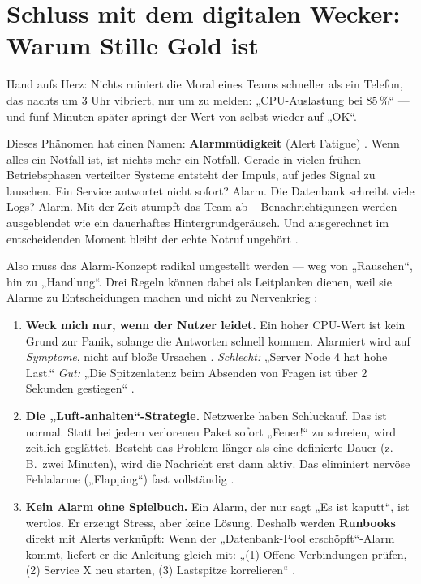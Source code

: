 \section{Schluss mit dem digitalen Wecker: Warum Stille Gold ist}

Hand aufs Herz: Nichts ruiniert die Moral eines Teams schneller als ein Telefon, das nachts um 3 Uhr vibriert, nur um zu melden: „CPU-Auslastung bei 85\,\%“ --- und fünf Minuten später springt der Wert von selbst wieder auf „OK“.

Dieses Phänomen hat einen Namen: \textbf{Alarmmüdigkeit} (Alert Fatigue) \cite{jalalvand2024alert}. Wenn alles ein Notfall ist, ist nichts mehr ein Notfall. Gerade in vielen frühen Betriebsphasen verteilter Systeme entsteht der Impuls, auf jedes Signal zu lauschen. Ein Service antwortet nicht sofort? Alarm. Die Datenbank schreibt viele Logs? Alarm. Mit der Zeit stumpft das Team ab – Benachrichtigungen werden ausgeblendet wie ein dauerhaftes Hintergrundgeräusch. Und ausgerechnet im entscheidenden Moment bleibt der echte Notruf ungehört \cite{jalalvand2024alert}.

Also muss das Alarm-Konzept radikal umgestellt werden --- weg von „Rauschen“, hin zu „Handlung“. Drei Regeln können dabei als Leitplanken dienen, weil sie Alarme zu Entscheidungen machen und nicht zu Nervenkrieg \cite{sakinala2025observability}\cite{jalalvand2024alert}:

\begin{enumerate}
\item \textbf{Weck mich nur, wenn der Nutzer leidet.} Ein hoher CPU-Wert ist kein Grund zur Panik, solange die Antworten schnell kommen. Alarmiert wird auf \emph{Symptome}, nicht auf bloße Ursachen \cite{sakinala2025observability}. \emph{Schlecht:} „Server Node 4 hat hohe Last.“ \emph{Gut:} „Die Spitzenlatenz beim Absenden von Fragen ist über 2 Sekunden gestiegen“ \cite{ewaschukMonitoringDistributedSystems}.

\item \textbf{Die „Luft-anhalten“-Strategie.} Netzwerke haben Schluckauf. Das ist normal. Statt bei jedem verlorenen Paket sofort „Feuer!“ zu schreien, wird zeitlich geglättet. Besteht das Problem länger als eine definierte Dauer (z.\,B.\ zwei Minuten), wird die Nachricht erst dann aktiv. Das eliminiert nervöse Fehlalarme („Flapping“) fast vollständig \cite{jalalvand2024alert}.

\item \textbf{Kein Alarm ohne Spielbuch.} Ein Alarm, der nur sagt „Es ist kaputt“, ist wertlos. Er erzeugt Stress, aber keine Lösung. Deshalb werden \textbf{Runbooks} direkt mit Alerts verknüpft: Wenn der „Datenbank-Pool erschöpft“-Alarm kommt, liefert er die Anleitung gleich mit: „(1) Offene Verbindungen prüfen, (2) Service X neu starten, (3) Lastspitze korrelieren“ \cite{gowda2022alertsAutomation}\cite{jalalvand2024alert}.
\end{enumerate}

